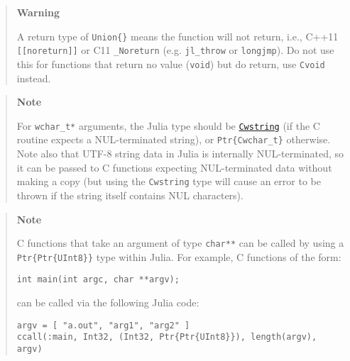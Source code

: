 \begin{quote}
\textbf{Warning}

A return type of \texttt{Union\{\}} means the function will not return, i.e., C++11 \texttt{[[noreturn]]} or C11 \texttt{\_Noreturn} (e.g. \texttt{jl\_throw} or \texttt{longjmp}). Do not use this for functions that return no value (\texttt{void}) but do return, use \texttt{Cvoid} instead.

\end{quote}


\begin{quote}
\textbf{Note}

For \texttt{wchar\_t*} arguments, the Julia type should be \hyperlink{510630608879002831}{\texttt{Cwstring}} (if the C routine expects a NUL-terminated string), or \texttt{Ptr\{Cwchar\_t\}} otherwise. Note also that UTF-8 string data in Julia is internally NUL-terminated, so it can be passed to C functions expecting NUL-terminated data without making a copy (but using the \texttt{Cwstring} type will cause an error to be thrown if the string itself contains NUL characters).

\end{quote}


\begin{quote}
\textbf{Note}

C functions that take an argument of type \texttt{char**} can be called by using a \texttt{Ptr\{Ptr\{UInt8\}\}} type within Julia. For example, C functions of the form:


\begin{lstlisting}
int main(int argc, char **argv);
\end{lstlisting}

can be called via the following Julia code:


\begin{verbatim}
argv = [ "a.out", "arg1", "arg2" ]
ccall(:main, Int32, (Int32, Ptr{Ptr{UInt8}}), length(argv), argv)
\end{verbatim}

\end{quote}


